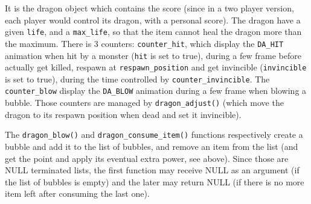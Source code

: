 \documentclass[12pt,a4paper]{article}
\newcommand{\cc}[1]{\texttt{#1}}
\begin{document}
It is the dragon object which contains the score (since in a two player version, each player would control its dragon, with a personal score). The dragon have a given \cc{life}, and a \cc{max_life}, so that the item cannot heal the dragon more than the maximum. There is 3 counters: \cc{counter_hit}, which display the \cc{DA_HIT} animation when hit by a monster (\cc{hit} is set to true), during a few frame before actually get killed, respawn at \cc{respawn_position} and get invincible (\cc{invincible} is set to true), during the time controlled by \cc{counter_invincible}. The \cc{counter_blow} display the \cc{DA_BLOW} animation during a few frame when blowing a bubble. Those counters are managed by \cc{dragon_adjust()} (which move the dragon to its respawn position when dead and set it invincible).

The \cc{dragon_blow()} and \cc{dragon_consume_item()} functions respectively create a bubble and add it to the list of bubbles, and remove an item from the list (and get the point and apply its eventual extra power, see above). Since those are NULL terminated lists, the first function may receive NULL as an argument (if the list of bubbles is empty) and the later may return NULL (if there is no more item left after consuming the last one).
%
%
%
%
\end{document}
